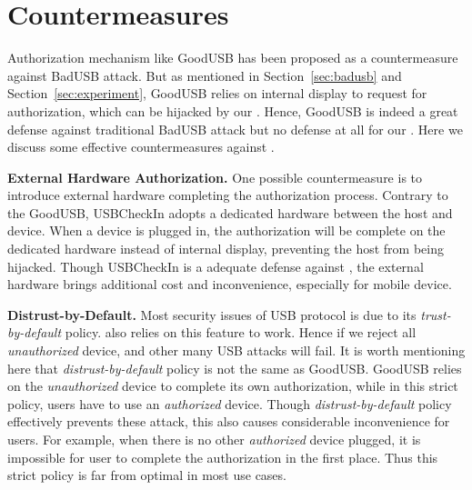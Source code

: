 \section{Countermeasures}
\label{sec:countermeasures}
Authorization mechanism like GoodUSB\cite{tian2015defending} has been proposed as a countermeasure against BadUSB attack. But as mentioned in Section~\ref{sec:badusb} and Section~\ref{sec:experiment}, GoodUSB relies on internal display to request for authorization, which can be hijacked by our \tool. Hence, GoodUSB is indeed a great defense against traditional BadUSB attack but no defense at all for our \tool. Here we discuss some effective countermeasures against \tool.

\textbf{External Hardware Authorization.}
One possible countermeasure is to introduce external hardware completing the authorization process. Contrary to the GoodUSB, USBCheckIn\cite{usbcheckin} adopts a dedicated hardware between the host and device. When a device is plugged in, the authorization will be complete on the dedicated hardware instead of internal display, preventing the host from being hijacked. Though USBCheckIn is a adequate defense against \tool, the external hardware brings additional cost and inconvenience, especially for mobile device.

\textbf{Distrust-by-Default.}
Most security issues of USB protocol is due to its \textit{trust-by-default} policy. \tool also relies on this feature to work. Hence if we reject all \textit{unauthorized} device, \tool and other many USB attacks will fail. It is worth mentioning here that \textit{distrust-by-default} policy is not the same as GoodUSB\cite{tian2015defending}. GoodUSB relies on the \textit{unauthorized} device to complete its own authorization, while in this strict policy, users have to use an \textit{authorized} device. Though \textit{distrust-by-default} policy effectively prevents these attack, this also causes considerable inconvenience for users. For example, when there is no other \textit{authorized} device plugged, it is impossible for user to complete the authorization in the first place. Thus this strict policy is far from optimal in most use cases.

